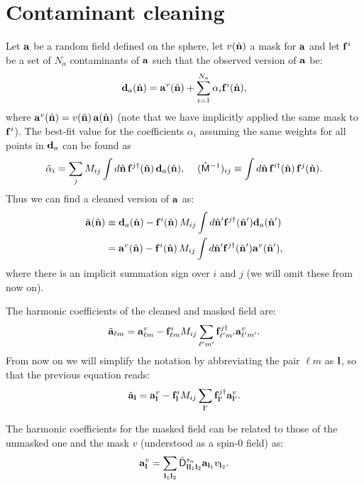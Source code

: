 \documentclass[a4paper,10pt]{article}
\newcommand{\nv}{\hat{\bf n}}
\begin{document}
\section{Contaminant cleaning}\label{sec:contaminant}
  Let ${\bf a}$ be a random field defined on the sphere, let $v(\nv)$ a mask for ${\bf a}$ and let ${\bf f}^i$ be a set of $N_a$ contaminants of ${\bf a}$ such that the observed version of ${\bf a}$ be:
  \begin{equation}
    {\bf d}_a(\nv)={\bf a}^v(\nv)+\sum_{i=1}^{N_a}\alpha_i{\bf f}^i(\nv),
  \end{equation}
  where ${\bf a}^v(\nv)=v(\nv)\,{\bf a}(\nv)$ (note that we have implicitly applied the same mask to ${\bf f}^i$). The best-fit value for the coefficients $\alpha_i$ assuming the same weights for all points in ${\bf d}_a$ can be found as
  \begin{equation}
    \tilde{\alpha}_i=\sum_jM_{ij}\int d\nv\,{\bf f}^{j\dag}(\nv)\,{\bf d}_a(\nv),\hspace{12pt}
    (\hat{\sf M}^{-1})_{ij}\equiv\int d\nv\,{\bf f}^{i\dag}(\nv)\,{\bf f}^j(\nv).
  \end{equation}
  Thus we can find a cleaned version of ${\bf a}$ as:
  \begin{align}\nonumber
    \tilde{\bf a}(\nv)&\equiv{\bf d}_a(\nv)-{\bf f}^i(\nv)\,M_{ij}\int d\nv'{\bf f}^{j\dag}(\nv'){\bf d}_a(\nv')\\\label{eq:deproject_real}
                      &={\bf a}^v(\nv)-{\bf f}^i(\nv)\,M_{ij}\int d\nv'{\bf f}^{j\dag}(\nv'){\bf a}^v(\nv'),
  \end{align}
  where there is an implicit summation sign over $i$ and $j$ (we will omit these from now on).
  
  The harmonic coefficients of the cleaned and masked field are:
  \begin{equation}
   \tilde{\bf a}_{\ell m}={\bf a}^v_{\ell m}-{\bf f}^i_{\ell m}M_{ij}\sum_{\ell' m'}{\bf f}^{j\dag}_{\ell' m'}{\bf a}^{v}_{\ell' m'}.
  \end{equation}
  From now on we will simplify the notation by abbreviating the pair $\ell m$ as ${\bf l}$, so that the previous equation reads:
  \begin{equation}\label{eq:deproject_harmonic}
   \tilde{\bf a}_{\bf l}={\bf a}^v_{\bf l}-{\bf f}^i_{\bf l}M_{ij}\sum_{{\bf l}'}{\bf f}^{j\dag}_{{\bf l}'}{\bf a}^{v}_{{\bf l}'}.
  \end{equation}

  The harmonic coefficients for the masked field can be related to those of the unmasked one and the mask $v$ (understood as a spin-0 field) as:
  \begin{equation}
    {\bf a}^v_{\bf l}=\sum_{{\bf l}_1{\bf l}_2}\hat{\sf D}^{s_a}_{{\bf l}{\bf l}_1{\bf l}_2}{\bf a}_{{\bf l}_1}v_{{\bf l}_2}.
  \end{equation}
\end{document}

